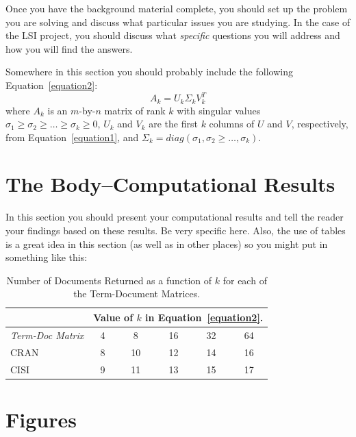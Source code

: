 \documentclass{IEEEtran}
\begin{document}
Once you have the background material complete, you should set up the problem you are solving and discuss what particular issues you are studying.  In the case of the LSI project, you should discuss what { \it specific } questions you will address and how you will find the answers.

Somewhere in this section you should probably include the following Equation~\ref{equation2}:
\begin{equation}
\label{equation2}
A_k = U_k \Sigma_k V_k^T
\end{equation}
where $A_k$ is an $m$-by-$n$ matrix of rank $k$ with singular values $\sigma_1 \ge \sigma_2 \ge \ldots \ge \sigma_k \ge 0$, $U_k$ and $V_k$ are the first $k$ columns of $U$ and $V$, respectively, from Equation~\ref{equation1}, and $\Sigma_k = diag(\sigma_1,\sigma_2 \ge \ldots, \sigma_k)$.




\section{The Body--Computational Results}

In this section you should present your computational results and tell the reader your findings based on these results.  Be very specific here.  Also, the use of tables is a great idea in this section (as well as in other places) so you might put in something like this:

\begin{table}
\begin{center}
\begin{tabular}{|l||c|c|c|c|c|} \hline
              &\multicolumn{5}{|c|}{Value of $k$ in
                                    Equation~\ref{equation2}.}\\ \hline
{\em Term-Doc Matrix} &  4 & 8 & 16 & 32 & 64 \\ \hline\hline
     CRAN             &  8 &10 & 12 & 14 & 16 \\ \hline
     CISI             &  9 &11 & 13 & 15 & 17 \\ \hline
\end{tabular}
\caption{\label{table:docs_returned} Number of Documents Returned as a
function of $k$ for each of the Term-Document Matrices.}
\end{center}
\end{table}


\section{Figures}
\end{document}
